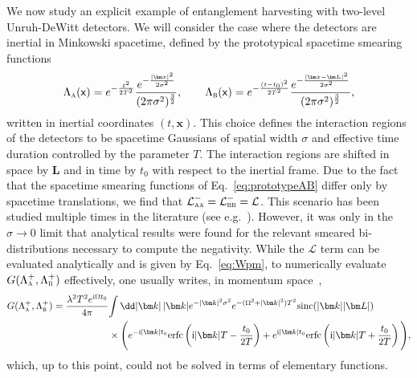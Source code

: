 \documentclass[letterpaper,12pt,titlepage,oneside,final]{book}
\newcommand{\mf}{\mathsf}%
\newcommand{\ii}{\mathrm{i}}
\newcommand{\tc}[1]{\textsc{#1}}
\begin{document}
We now study an explicit example of entanglement harvesting with two-level Unruh-DeWitt detectors. We will consider the case where the detectors are inertial in Minkowski spacetime, defined by the prototypical spacetime smearing functions
\begin{align}\label{eq:prototypeAB}
    \Lambda_\tc{a}(\mf x) = e^{- \frac{t^2}{2 T^2}} \frac{e^{-\frac{|\bm x|^2}{2 \sigma^2}}}{(2\pi \sigma^2)^\frac{3}{2}},\quad \quad
    \Lambda_\tc{b}(\mf x) = e^{- \frac{(t-t_0)^2}{2 T^2}} \frac{e^{-\frac{|\bm x-\bm L|^2}{2 \sigma^2}}}{(2\pi \sigma^2)^\frac{3}{2}},
\end{align}
written in inertial coordinates $(t,\bm x)$. This choice defines the interaction regions of the detectors to be spacetime Gaussians of spatial width $\sigma$ and effective time duration controlled by the parameter $T$. The interaction regions are shifted in space by $\bm L$ and in time by $t_0$ with respect to the inertial frame. Due to the fact that the spacetime smearing functions of Eq.~\eqref{eq:prototypeAB} differ only by spacetime translations, we find that $\mathcal{L}_{\tc{aa}}^{-} = \mathcal{L}_{\tc{bb}}^{-} = \mathcal{L}$. This scenario has been studied multiple times in the literature (see e.g.~\cite{Pozas-Kerstjens:2015,Pozas2016,ericksonNew,hectorMass,Ng1}). However, it was only in the $\sigma \to 0$ limit that analytical results were found for the relevant smeared bi-distributions necessary to compute the negativity. While the $\mathcal{L}$ term can be evaluated analytically and is given by Eq.~\eqref{eq:Wpm}, to numerically evaluate $G(\Lambda_\tc{a}^+,\Lambda_\tc{b}^+)$ effectively, one usually writes, in momentum space~\cite{Pozas-Kerstjens:2015},
\begin{align}\label{eq:GABk}
    G(\Lambda_\tc{a}^+,\Lambda_\tc{b}^+) = \frac{\lambda^2 T^2e^{\ii \Omega t_0}}{4 \pi }&\!\int \dd |\bm k|\,|\bm k| e^{- |\bm k|^2 \sigma^2} e^{-(\Omega^2 + |\bm k|^2)T^2} \text{sinc}(|\bm k||\bm L|)\\
    &\times \Bigg(e^{-\ii |\bm k| t_0}\text{erfc}\left(\ii |\bm k|T -\frac{t_0}{2T}\right)+e^{\ii |\bm k| t_0}\text{erfc}\left(\ii |\bm k|T +\frac{t_0}{2T}\right)\Bigg),\nonumber
\end{align}
which, up to this point, could not be solved in terms of elementary functions.
\end{document}
